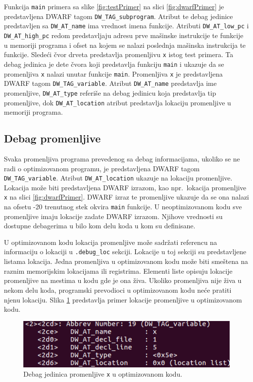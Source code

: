 \documentclass[12pt,oneside]{memoir}
\begin{document}
Funkcija \texttt{main} primera sa slike \ref{fig:testPrimer} na slici \ref{fig:dwarfPrimer} je predstavljena DWARF tagom \texttt{DW\_TAG\_subprogram}. Atribut te debag jedinice predstavljen sa \texttt{DW\_AT\_name} ima vrednost imena funkcije. Atributi \texttt{DW\_AT\_low\_pc} i \texttt{DW\_AT\_high\_pc} redom predstavljaju adresu prve mašinske instrukcije te funkcije u memoriji programa i ofset na kojem se nalazi poslednja mašinska instrukcija te funkcije. Sledeći čvor drveta predstavlja promenljivu \texttt{x} istog test primera. Ta debag jedinica je dete čvora koji predstavlja funkciju \texttt{main} i ukazuje da se promenljiva \texttt{x} nalazi unutar funkcije \texttt{main}. Promenljiva \texttt{x} je predstavljena DWARF tagom \texttt{DW\_TAG\_variable}. Atribut \texttt{DW\_AT\_name} predstavlja ime promenljive, \texttt{DW\_AT\_type} referiše na debag jedinicu koja predstavlja tip promenljive, dok \texttt{DW\_AT\_location} atribut predstavlja lokaciju promenljive u memoriji programa. 

\subsection{Debag promenljive}

Svaka promenljiva programa prevedenog sa debag informacijama, ukoliko se ne radi o optimizovanom programu, je predstavljena DWARF tagom \texttt{DW\_TAG\_variable}. Atribut \texttt{DW\_AT\_location} ukazuje na lokaciju promenljive. Lokacija može biti predstavljena DWARF izrazom, kao npr.~lokacija promenljive \texttt{x} na slici \ref{fig:dwarfPrimer}. DWARF izraz te promenljive ukazuje da se ona nalazi na ofsetu -20 trenutnog stek okvira \texttt{main} funkcije. U neoptimizovanom kodu sve promenljive imaju lokacije zadate DWARF izrazom. Njihove vrednosti su dostupne debagerima u bilo kom delu koda u kom su definisane.

U optimizovanom kodu lokacija promenljive može sadržati referencu na informaciju o lokaciji u \texttt{.debug\_loc} sekciji. Lokacije u toj sekciji su predstavljene listama lokacija. Jedna promenljiva u optimizovanom kodu može biti smeštena na raznim memorijskim lokacijama ili registrima. Elementi liste opisuju lokacije promenljive na mestima u kodu gde je ona živa. Ukoliko promenljiva nije živa u nekom delu koda, programski prevodioci u optimizovanom kodu neće pratiti njenu lokaciju. Slika \ref{fig:optPrimer} predstavlja primer lokacije promenljive u optimizovanom kodu.

\begin{figure}[h!]
	\begin{center}
		\includegraphics[scale=0.6]{slike/optimizovanPrimer.png}
	\end{center}
	\caption{Debag jedinica promenljive \texttt{x} u optimizovanom kodu.}
	\label{fig:optPrimer}
\end{figure}
\end{document}
